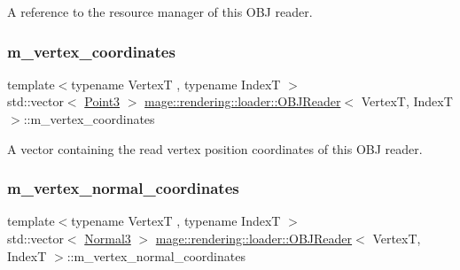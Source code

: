 A reference to the resource manager of this O\+BJ reader. \mbox{\label{classmage_1_1rendering_1_1loader_1_1_o_b_j_reader_a393e0932f169a786e38f120fc6f0d84b}} 
\subsubsection{\texorpdfstring{m\+\_\+vertex\+\_\+coordinates}{m\_vertex\_coordinates}}
{\footnotesize\ttfamily template$<$typename VertexT , typename IndexT $>$ \\
std\+::vector$<$ \mbox{\hyperlink{structmage_1_1_point3}{Point3}} $>$ \mbox{\hyperlink{classmage_1_1rendering_1_1loader_1_1_o_b_j_reader}{mage\+::rendering\+::loader\+::\+O\+B\+J\+Reader}}$<$ VertexT, IndexT $>$\+::m\+\_\+vertex\+\_\+coordinates\hspace{0.3cm}{\ttfamily [private]}}

A vector containing the read vertex position coordinates of this O\+BJ reader. \mbox{\label{classmage_1_1rendering_1_1loader_1_1_o_b_j_reader_ac977ade8154bef446524526e8297f3eb}} 
\subsubsection{\texorpdfstring{m\+\_\+vertex\+\_\+normal\+\_\+coordinates}{m\_vertex\_normal\_coordinates}}
{\footnotesize\ttfamily template$<$typename VertexT , typename IndexT $>$ \\
std\+::vector$<$ \mbox{\hyperlink{structmage_1_1_normal3}{Normal3}} $>$ \mbox{\hyperlink{classmage_1_1rendering_1_1loader_1_1_o_b_j_reader}{mage\+::rendering\+::loader\+::\+O\+B\+J\+Reader}}$<$ VertexT, IndexT $>$\+::m\+\_\+vertex\+\_\+normal\+\_\+coordinates\hspace{0.3cm}{\ttfamily [private]}}

